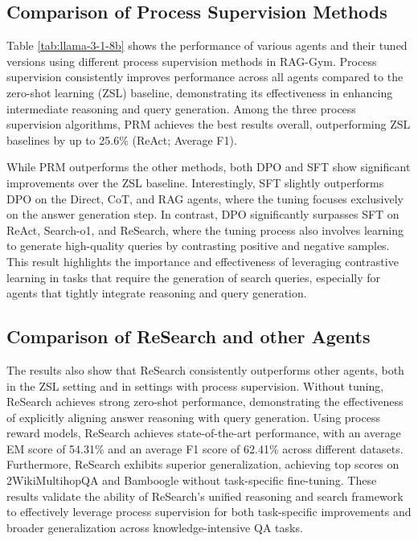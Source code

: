 \subsection{Comparison of Process Supervision Methods}

Table \ref{tab:llama-3-1-8b} shows the performance of various agents and their tuned versions using different process supervision methods in RAG-Gym. Process supervision consistently improves performance across all agents compared to the zero-shot learning (ZSL) baseline, demonstrating its effectiveness in enhancing intermediate reasoning and query generation. Among the three process supervision algorithms, PRM achieves the best results overall, outperforming ZSL baselines by up to 25.6\% (ReAct; Average F1).

While PRM outperforms the other methods, both DPO and SFT show significant improvements over the ZSL baseline. Interestingly, SFT slightly outperforms DPO on the Direct, CoT, and RAG agents, where the tuning focuses exclusively on the answer generation step. In contrast, DPO significantly surpasses SFT on ReAct, Search-o1, and ReSearch, where the tuning process also involves learning to generate high-quality queries by contrasting positive and negative samples. This result highlights the importance and effectiveness of leveraging contrastive learning in tasks that require the generation of search queries, especially for agents that tightly integrate reasoning and query generation.

\subsection{Comparison of ReSearch and other Agents}

The results also show that ReSearch consistently outperforms other agents, both in the ZSL setting and in settings with process supervision. Without tuning, ReSearch achieves strong zero-shot performance, demonstrating the effectiveness of explicitly aligning answer reasoning with query generation. Using process reward models, ReSearch achieves state-of-the-art performance, with an average EM score of 54.31\% and an average F1 score of 62.41\% across different datasets. Furthermore, ReSearch exhibits superior generalization, achieving top scores on 2WikiMultihopQA and Bamboogle without task-specific fine-tuning. These results validate the ability of ReSearch's unified reasoning and search framework to effectively leverage process supervision for both task-specific improvements and broader generalization across knowledge-intensive QA tasks.

